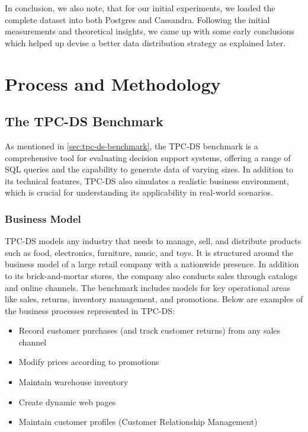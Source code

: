 \documentclass[conference]{IEEEtran}
\begin{document}
In conclusion, we also note, that for our initial experiments, we loaded the complete dataset into both Postgres and Cassandra. Following the initial measurements and theoretical insights, we came up with some early conclusions
which helped up devise a better data distribution strategy as explained later.

\section{Process and Methodology}

\subsection{The TPC-DS Benchmark}

As mentioned in \ref{sec:tpc-ds-benchmark}, the TPC-DS benchmark is a comprehensive tool for evaluating decision support systems,
offering a range of SQL queries and the capability to generate data of varying sizes. In addition to its
technical features, TPC-DS also simulates a realistic business environment, which is crucial for understanding
its applicability in real-world scenarios.

\subsubsection{Business Model}

TPC-DS models any industry that needs to manage, sell, and distribute products such as food, electronics, furniture, music,
and toys. It is structured around the business model of a large retail company with a nationwide presence. In addition to
its brick-and-mortar stores, the company also conducts sales through catalogs and online channels. The benchmark includes
models for key operational areas like sales, returns, inventory management, and promotions. Below are examples of the
business processes represented in TPC-DS:

\begin{itemize}
    \item \textbf{} Record customer purchases (and track customer returns) from any sales channel
    \item \textbf{} Modify prices according to promotions
    \item \textbf{} Maintain warehouse inventory
    \item \textbf{} Create dynamic web pages
    \item \textbf{} Maintain customer profiles (Customer Relationship Management)
\end{itemize}
\end{document}
